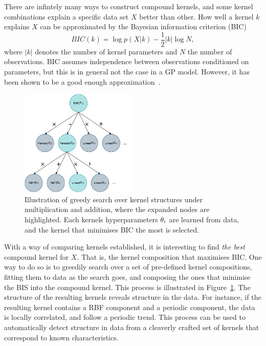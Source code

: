 There are infintely many ways to construct compound kernels, and some
kernel combinations explain a specific data set $X$ better than
other. How well a kernel $k$ explains $X$ can be approximated
by the Bayesian information criterion (BIC)
\begin{equation}
  BIC(k) = \log p(X \vert k) - \frac{1}{2} \vert k \vert \log N,
\end{equation}
where $\vert k \vert$ denotes the number of kernel parameters and $N$
the number of observations. BIC assumes independence between
observations conditioned on parameters, but this is in general not the
case in a GP model. However, it has been shown to be a good enough approximation~\cite{duvenaud2013structure}.
\begin{figure}
  \centering
  \includegraphics[width=0.5\textwidth]{figures/compound-kernel-search}
  \caption{Illustration of greedy search over kernel structures under
    multiplication and addition, where the
    expanded nodes are highlighted. Each kernels hyperparameters
    $\theta_i$ are learned from data, and the kernel that
    minimises BIC the most is selected.}\label{fig:compound-kernel-search}
\end{figure}

With a way of comparing kernels established, it is interesting to find
\textit{the best} compound kernel for $X$. That is, the kernel
composition that maximises BIC. One way to do so is to
greedily search over a set of pre-defined kernel compositions, fitting
them to data as the search goes, and composing the ones that minimise
the BIS into the compound kernel. This process is illustrated in Figure~\ref{fig:compound-kernel-search}.
The structure of the resulting kernels reveals structure in the
data. For instance, if the resulting kernel contains a RBF component and a periodic
component, the data is locally correlated, and follow a periodic
trend. This process can be used to automatically detect structure in
data from a cleaverly crafted set of kernels that correspond to
known characteristics.

